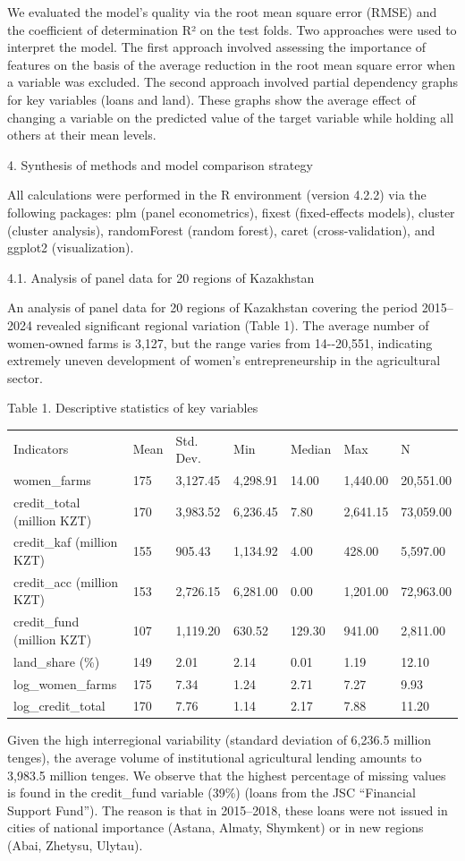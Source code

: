 \documentclass[
]{article}
\begin{document}
We evaluated the model's quality via the root mean square error (RMSE)
and the coefficient of determination R² on the test folds. Two
approaches were used to interpret the model. The first approach involved
assessing the importance of features on the basis of the average
reduction in the root mean square error when a variable was excluded.
The second approach involved partial dependency graphs for key variables
(loans and land). These graphs show the average effect of changing a
variable on the predicted value of the target variable while holding all
others at their mean levels.

4. Synthesis of methods and model comparison strategy

All calculations were performed in the R environment (version 4.2.2) via
the following packages: plm (panel econometrics), fixest (fixed-effects
models), cluster (cluster analysis), randomForest (random forest), caret
(cross-validation), and ggplot2 (visualization).

4.1. Analysis of panel data for 20 regions of Kazakhstan

An analysis of panel data for 20 regions of Kazakhstan covering the
period 2015--2024 revealed significant regional variation (Table 1). The
average number of women-owned farms is 3,127, but the range varies from
14-\/-20,551, indicating extremely uneven development of women's
entrepreneurship in the agricultural sector.

Table 1. Descriptive statistics of key variables

\begin{longtable}[]{@{}lllllll@{}}
\toprule
\endhead
Indicators & Mean & Std. Dev. & Min & Median & Max & N\tabularnewline
women\_farms & 175 & 3,127.45 & 4,298.91 & 14.00 & 1,440.00 &
20,551.00\tabularnewline
credit\_total (million KZT) & 170 & 3,983.52 & 6,236.45 & 7.80 &
2,641.15 & 73,059.00\tabularnewline
credit\_kaf (million KZT) & 155 & 905.43 & 1,134.92 & 4.00 & 428.00 &
5,597.00\tabularnewline
credit\_acc (million KZT) & 153 & 2,726.15 & 6,281.00 & 0.00 & 1,201.00
& 72,963.00\tabularnewline
credit\_fund (million KZT) & 107 & 1,119.20 & 630.52 & 129.30 & 941.00 &
2,811.00\tabularnewline
land\_share (\%) & 149 & 2.01 & 2.14 & 0.01 & 1.19 &
12.10\tabularnewline
log\_women\_farms & 175 & 7.34 & 1.24 & 2.71 & 7.27 &
9.93\tabularnewline
log\_credit\_total & 170 & 7.76 & 1.14 & 2.17 & 7.88 &
11.20\tabularnewline
\bottomrule
\end{longtable}

Given the high interregional variability (standard deviation of 6,236.5
million tenges), the average volume of institutional agricultural
lending amounts to 3,983.5 million tenges. We observe that the highest
percentage of missing values is found in the credit\_fund variable
(39\%) (loans from the JSC ``Financial Support Fund''). The reason is
that in 2015--2018, these loans were not issued in cities of national
importance (Astana, Almaty, Shymkent) or in new regions (Abai, Zhetysu,
Ulytau).
\end{document}
